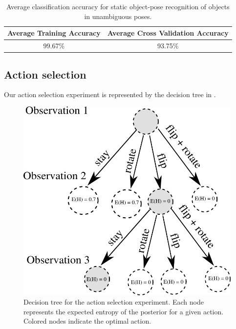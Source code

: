         \begin{table}[h]
                \centering
                \begin{tabular}{|c|c|}
                \hline
                Average Training Accuracy & Average Cross Validation Accuracy \\
                \hline
                99.67\% & 93.75\% \\
                \hline
                \end{tabular}
                \caption{Average classification accuracy for static object-pose recognition of objects in unambiguous poses.}
                \label{tab:accuracy}
        \end{table}

    \subsection{Action selection}

        Our action selection experiment is represented by the decision tree in .

        \begin{figure}[h]
            \centering
            \includegraphics[scale=0.7]{pics/tree_small.png}
            \caption{Decision tree for the action selection experiment. Each node represents the expected entropy of the posterior for a given action. Colored nodes indicate the optimal action.}
            \label{fig:tree} %
        \end{figure}

